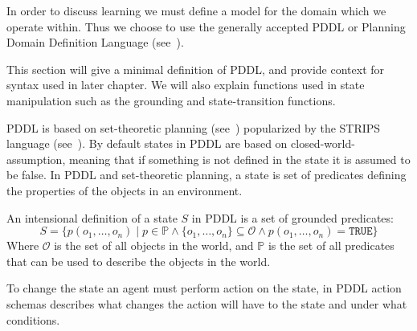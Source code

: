 \documentclass[../Master.tex]{subfiles}
\begin{document}
In order to discuss learning we must define a model for the domain which we operate within. Thus we choose to use the generally accepted PDDL or Planning Domain Definition Language (see~\cite{PDDL}). 

This section will give a minimal definition of PDDL, and provide context for syntax used in later chapter. We will also explain functions used in state manipulation such as the grounding and state-transition functions.


PDDL is based on set-theoretic planning (see~\cite{ghallab2004a}) popularized by the STRIPS language (see~\cite{STRIPS}). By default states in PDDL are based on closed-world-assumption, meaning that if something is not defined in the state it is assumed to be false. 
In PDDL and set-theoretic planning, a state is set of predicates defining the properties of the objects in an environment.

\begin{definition} 
	An intensional definition of a state $S$ in PDDL is a set of grounded predicates:
    \begin{equation*}
        S=\{p(o_1,\dots,o_n) \mid  p \in \mathbb{P} \land \{o_1,\dots,o_n\} \subseteq \mathcal{O} \land p(o_1,\dots,o_n) = \texttt{TRUE}\}
    \end{equation*}
    Where $\mathcal{O}$ is the set of all objects in the world, and $\mathbb{P}$ is the set of all predicates that can be used to describe the objects in the world.
\end{definition}

To change the state an agent must perform action on the state, in PDDL action schemas describes what changes the action will have to the state and under what conditions. 
\end{document}
